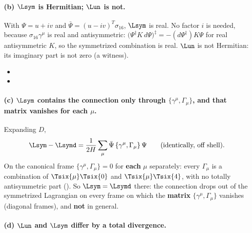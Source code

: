 \paragraph{(b) $\Lsym$ is Hermitian; $\Lun$ is not.} With $\Psi=u+iv$ and
$\bar\Psi=(u-iv)^{T}\sigma_{16}$, $\Lsym$ is real. No factor $i$ is needed, because
$\sigma_{16}\gamma^\mu$ is real and antisymmetric:
$\bigl(\Psi^{\ddagger}K\,d\Psi\bigr)^{\ddagger}=-(d\Psi^{\ddagger})K\Psi$ for real antisymmetric $K$, so
the symmetrized combination is real. $\Lun$ is not Hermitian: its imaginary part is not zero (a
witness). 
\begin{itemize}
  \item {}
  \item {}
\end{itemize}

\paragraph{(c) $\Lsym$ contains the connection only through $\{\gamma^\mu,\Gamma_\mu\}$, and that
matrix vanishes for each $\mu$.} Expanding $D$,
\[
  \Lsym-\Lsymd=\frac{1}{2H}\sum_\mu\bar\Psi\,\{\gamma^\mu,\Gamma_\mu\}\,\Psi\qquad\text{(identically, off shell)}.
\]
On the canonical frame $\{\gamma^\mu,\Gamma_\mu\}=0$ for \textbf{each} $\mu$ separately: every
$\Gamma_\mu$ is a combination of $\Tsix{\mu}\Tsix{0}$ and $\Tsix{\mu}\Tsix{4}$, with no totally
antisymmetric part (). So $\Lsym=\Lsymd$ there: the connection drops out of the
symmetrized Lagrangian on every frame on which the \textbf{matrix} $\{\gamma^\mu,\Gamma_\mu\}$
vanishes (diagonal frames), and \textbf{not} in general. 

\paragraph{(d) $\Lun$ and $\Lsym$ differ by a total divergence.} 

